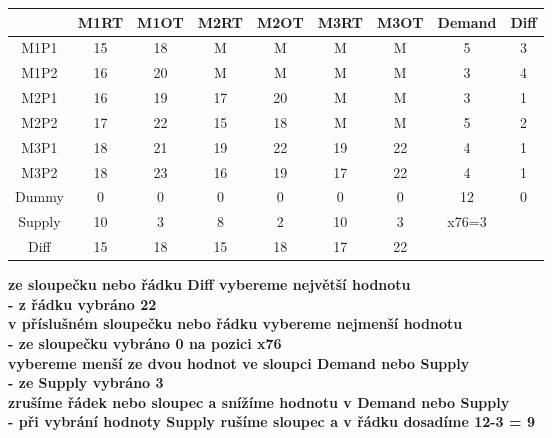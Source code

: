 \documentclass{article}%
\begin{document}
\begin{tabular}{c|ccccc|c|cc}
    & M1RT & M1OT & M2RT & M2OT & M3RT & M3OT & Demand               & Diff                 \\
    \midrule
    M1P1   & 15   & 18   & M    & M    & M    & M    & 5                    & 3                    \\
    M1P2   & 16   & 20   & M    & M    & M    & M    & 3                    & 4                    \\
    M2P1   & 16   & 19   & 17   & 20   & M    & M    & 3                    & 1                    \\
    M2P2   & 17   & 22   & 15   & 18   & M    & M    & 5                    & 2                    \\
    M3P1   & 18   & 21   & 19   & 22   & 19   & 22   & 4                    & 1                    \\
    M3P2   & 18   & 23   & 16   & 19   & 17   & 22   & 4                    & 1                    \\
    \cmidrule{2-9}
    Dummy  & 0    & 0    & 0    & 0    & 0    & 0    & 12                   & 0                    \\
    \cmidrule{2-9}
    Supply & 10   & 3    & 8    & 2    & 10   & 3    & x76=3                &                      \\
    Diff   & 15   & 18   & 15   & 18   & 17   & 22   &                      &                      \\
\end{tabular}
\newline
\textbf{
    ze sloupečku nebo řádku Diff vybereme největší hodnotu \\
        -   z řádku vybráno 22 \\
    v příslušném sloupečku nebo řádku vybereme nejmenší hodnotu \\
        -   ze sloupečku vybráno 0 na pozici x76 \\
    vybereme menší ze dvou hodnot ve sloupci Demand nebo Supply \\
        -   ze Supply vybráno 3 \\
    zrušíme řádek nebo sloupec a snížíme hodnotu v Demand nebo Supply \\
        -   při vybrání hodnoty Supply rušíme sloupec a v řádku dosadíme 12-3 = 9 \\
}
\newline
\newline
\end{document}
